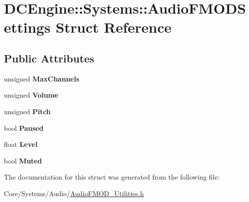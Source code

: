 \hypertarget{structDCEngine_1_1Systems_1_1AudioFMODSettings}{\section{D\-C\-Engine\-:\-:Systems\-:\-:Audio\-F\-M\-O\-D\-Settings Struct Reference}
\label{structDCEngine_1_1Systems_1_1AudioFMODSettings}
}
\subsection*{Public Attributes}
\begin{DoxyCompactItemize}
\item 
\hypertarget{structDCEngine_1_1Systems_1_1AudioFMODSettings_a706bdcbdc7c9436aa7091c15e456942a}{unsigned {\bfseries Max\-Channels}}\label{structDCEngine_1_1Systems_1_1AudioFMODSettings_a706bdcbdc7c9436aa7091c15e456942a}

\item 
\hypertarget{structDCEngine_1_1Systems_1_1AudioFMODSettings_a80409fe23dce4333c7335028a20b1995}{unsigned {\bfseries Volume}}\label{structDCEngine_1_1Systems_1_1AudioFMODSettings_a80409fe23dce4333c7335028a20b1995}

\item 
\hypertarget{structDCEngine_1_1Systems_1_1AudioFMODSettings_a886a91dd7b3f79c48f95e54f2c2a456f}{unsigned {\bfseries Pitch}}\label{structDCEngine_1_1Systems_1_1AudioFMODSettings_a886a91dd7b3f79c48f95e54f2c2a456f}

\item 
\hypertarget{structDCEngine_1_1Systems_1_1AudioFMODSettings_a39e6622a3514d031679b7a52b3f889de}{bool {\bfseries Paused}}\label{structDCEngine_1_1Systems_1_1AudioFMODSettings_a39e6622a3514d031679b7a52b3f889de}

\item 
\hypertarget{structDCEngine_1_1Systems_1_1AudioFMODSettings_ace7ae1e8ed099c55d78876f5dd9a146a}{float {\bfseries Level}}\label{structDCEngine_1_1Systems_1_1AudioFMODSettings_ace7ae1e8ed099c55d78876f5dd9a146a}

\item 
\hypertarget{structDCEngine_1_1Systems_1_1AudioFMODSettings_af9be4d854e50e532bc8b236ad7d47dff}{bool {\bfseries Muted}}\label{structDCEngine_1_1Systems_1_1AudioFMODSettings_af9be4d854e50e532bc8b236ad7d47dff}

\end{DoxyCompactItemize}


The documentation for this struct was generated from the following file\-:\begin{DoxyCompactItemize}
\item 
Core/\-Systems/\-Audio/\hyperlink{AudioFMOD__Utilities_8h}{Audio\-F\-M\-O\-D\-\_\-\-Utilities.\-h}\end{DoxyCompactItemize}
